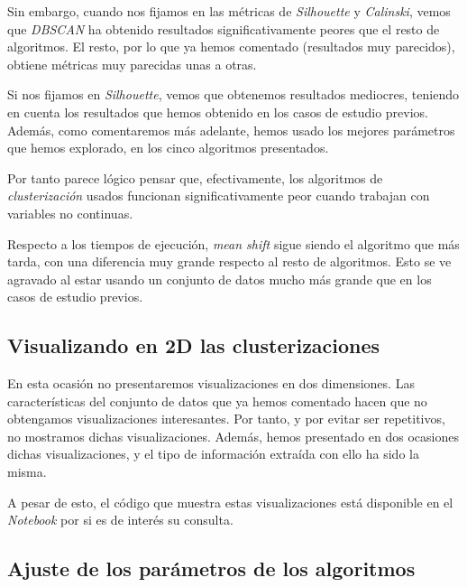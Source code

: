 \documentclass[11pt]{article}
\begin{document}
Sin embargo, cuando nos fijamos en las métricas de \emph{Silhouette} y \emph{Calinski}, vemos que \emph{DBSCAN} ha obtenido resultados significativamente peores que el resto de algoritmos. El resto, por lo que ya hemos comentado (resultados muy parecidos), obtiene métricas muy parecidas unas a otras.

Si nos fijamos en \emph{Silhouette}, vemos que obtenemos resultados mediocres, teniendo en cuenta los resultados que hemos obtenido en los casos de estudio previos. Además, como comentaremos más adelante, hemos usado los mejores parámetros que hemos explorado, en los cinco algoritmos presentados.

Por tanto parece lógico pensar que, efectivamente, los algoritmos de \emph{clusterización} usados funcionan significativamente peor cuando trabajan con variables no continuas.

Respecto a los tiempos de ejecución, \emph{mean shift} sigue siendo el algoritmo que más tarda, con una diferencia muy grande respecto al resto de algoritmos. Esto se ve agravado al estar usando un conjunto de datos mucho más grande que en los casos de estudio previos.

\pagebreak

\subsection{Visualizando en 2D las clusterizaciones}

En esta ocasión no presentaremos visualizaciones en dos dimensiones. Las características del conjunto de datos que ya hemos comentado hacen que no obtengamos visualizaciones interesantes. Por tanto, y por evitar ser repetitivos, no mostramos dichas visualizaciones. Además, hemos presentado en dos ocasiones dichas visualizaciones, y el tipo de información extraída con ello ha sido la misma.

A pesar de esto, el código que muestra estas visualizaciones está disponible en el \emph{Notebook} por si es de interés su consulta.

\pagebreak

\subsection{Ajuste de los parámetros de los algoritmos}


\pagebreak



\end{document}
